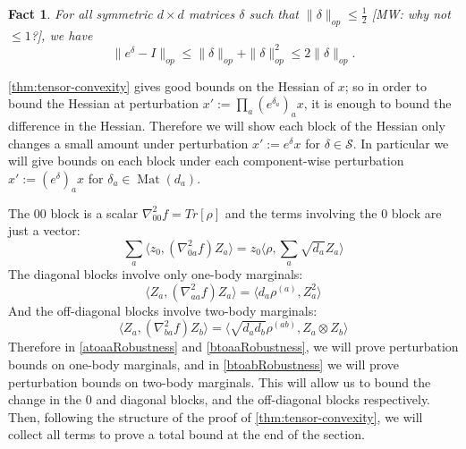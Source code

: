 \documentclass[aos]{imsart}
\newtheorem{fact}[theorem]{Fact}
\theoremstyle{definition}
\numberwithin{equation}{section}
\DeclareMathOperator{\Mat}{Mat}
\DeclareMathOperator{\tr}{Tr}
\newcommand{\Sym}{\mathcal{S}}
\newcommand{\samp}{x}
\newcommand{\CF}[1]{{\color{purple}[CF: #1]}}
\newcommand{\MW}[1]{{\color{red}[MW: #1]}}
\begin{document}
\begin{appendix}
\begin{fact} For all symmetric $d\times d$ matrices $\delta $ such that $ \|\delta\|_{op} \leq \frac{1}{2}$ \MW{why not $\leq1$?}, we have
$$ \|e^{\delta} - I\|_{op} \leq \|\delta\|_{op} + \|\delta\|_{op}^{2} \leq 2 \|\delta\|_{op}.$$
\end{fact}

\cref{thm:tensor-convexity} gives good bounds on the Hessian of $\samp$; so in order to bound the Hessian at perturbation $\samp' := \prod_{a} (e^{\delta_{a}})_{a} \samp$, it is enough to bound the difference in the Hessian.
Therefore we will show each block of the Hessian only changes a small amount under perturbation $x' := e^{\delta} x$ for $\delta \in \Sym$. In particular we will give bounds on each block under each component-wise perturbation $x' := (e^{\delta})_{a} x$ for $\delta_{a} \in \Mat(d_{a})$.


The $00$ block is a scalar $\nabla^{2}_{00} f = Tr[\rho]$ and the terms involving the $0$ block are just a vector:
\[ \sum_{a} \langle z_{0}, (\nabla^{2}_{0a} f) Z_{a} \rangle = z_{0} \langle \rho, \sum_{a} \sqrt{d_{a}} Z_{a} \rangle       \]
The diagonal blocks involve only one-body marginals:
\[ \langle Z_{a}, (\nabla^{2}_{aa} f) Z_{a} \rangle = \langle d_{a} \rho^{(a)}, Z_{a}^{2} \rangle       \]
And the off-diagonal blocks involve two-body marginals:
\[ \langle Z_{a}, (\nabla^{2}_{ba} f) Z_{b} \rangle =  \langle \sqrt{d_{a} d_{b}} \rho^{(ab)}, Z_{a} \otimes Z_{b} \rangle   \]
Therefore in \cref{atoaaRobustness} and \cref{btoaaRobustness}, we will prove perturbation bounds on one-body marginals, and in \cref{btoabRobustness} we will prove perturbation bounds on two-body marginals. This will allow us to bound the change in the $0$ and diagonal blocks, and the off-diagonal blocks respectively. Then, following the structure of the proof of \cref{thm:tensor-convexity}, we will collect all terms to prove a total bound at the end of the section.



\end{appendix}
\end{document}
